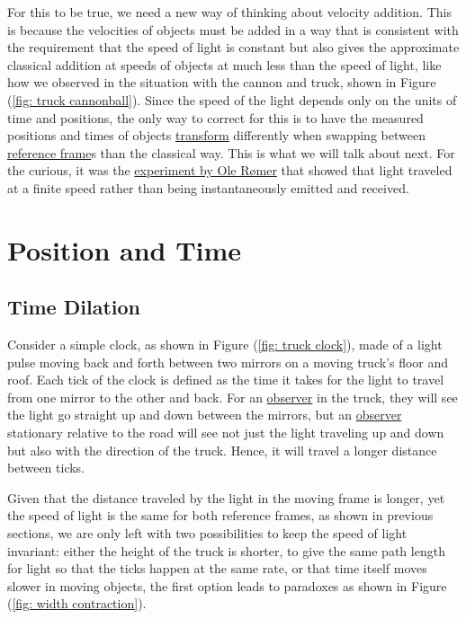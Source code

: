 For this to be true, we need a new way of thinking about velocity addition.
This is because the velocities of objects must be added in a way that is consistent with the requirement that the speed of light is constant but also gives the approximate classical addition at speeds of objects at much less than the speed of light, like how we observed in the situation with the cannon and truck, shown in Figure (\ref{fig: truck cannonball}).
Since the speed of the light depends only on the units of time and positions, the only way to correct for this is to have the measured positions and times of objects \hyperlink{def-transform}{transform} differently when swapping between \hyperlink{def-Reference-frame}{reference frame}s than the classical way.
This is what we will talk about next.
For the curious, it was the \href{https://scienceready.com.au/pages/determination-of-speed-of-light}{experiment by Ole Rømer} that showed that light traveled at a finite speed rather than being instantaneously emitted and received.

\section{Position and Time} \label{sect: Position and Time}

\subsection{Time Dilation} \label{Subsect: Time Dilation}

Consider a simple clock, as shown in Figure (\ref{fig: truck clock}), made of a light pulse moving back and forth between two mirrors on a moving truck's floor and roof.
Each tick of the clock is defined as the time it takes for the light to travel from one mirror to the other and back.
For an \hyperlink{def-observer}{observer} in the truck, they will see the light go straight up and down between the mirrors, but an \hyperlink{def-observer}{observer} stationary relative to the road will see not just the light traveling up and down but also with the direction of the truck.
Hence, it will travel a longer distance between ticks.

Given that the distance traveled by the light in the moving frame is longer, yet the speed of light is the same for both reference frames, as shown in previous sections, we are only left with two possibilities to keep the speed of light invariant: either the height of the truck is shorter, to give the same path length for light so that the ticks happen at the same rate, or that time itself moves slower in moving objects, the first option leads to paradoxes as shown in Figure (\ref{fig: width contraction}).

